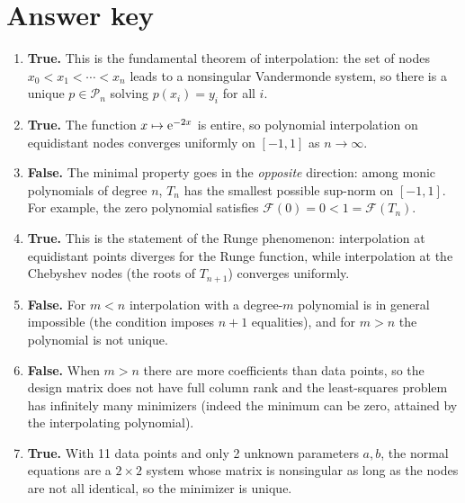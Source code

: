 \documentclass[a4paper]{article}
\begin{document}
\section*{Answer key}
\begin{enumerate}[itemsep=8pt]
    \item \textbf{True.}
        This is the fundamental theorem of interpolation: the set of nodes
        $x_0 < x_1 < \dotsb < x_n$ leads to a nonsingular Vandermonde
        system, so there is a unique $p \in \mathcal P_n$ solving
        $p(x_i) = y_i$ for all $i$.

    \item \textbf{True.}
        The function $x \mapsto \mathrm e^{-2x}$ is entire, so polynomial
        interpolation on equidistant nodes converges uniformly on $[-1,1]$
        as $n \to \infty$.

    \item \textbf{False.}
        The minimal property goes in the \emph{opposite} direction:
        among monic polynomials of degree $n$, $T_n$ has the smallest
        possible sup-norm on $[-1,1]$.
        For example, the zero polynomial satisfies
        $\mathcal F(0) = 0 < 1 = \mathcal F(T_n)$.

    \item \textbf{True.}
        This is the statement of the Runge phenomenon: interpolation at
        equidistant points diverges for the Runge function, while
        interpolation at the Chebyshev nodes (the roots of $T_{n+1}$)
        converges uniformly.

    \item \textbf{False.}
        For $m < n$ interpolation with a degree-$m$ polynomial is in
        general impossible (the condition imposes $n+1$ equalities), and
        for $m > n$ the polynomial is not unique.

    \item \textbf{False.}
        When $m > n$ there are more coefficients than data points, so the
        design matrix does not have full column rank and the
        least-squares problem has infinitely many minimizers
        (indeed the minimum can be zero, attained by the interpolating
        polynomial).

    \item \textbf{True.}
        With 11 data points and only 2 unknown parameters $a, b$, the
        normal equations are a $2 \times 2$ system whose matrix is
        nonsingular as long as the nodes are not all identical, so the
        minimizer is unique.


\end{enumerate}
\end{document}
